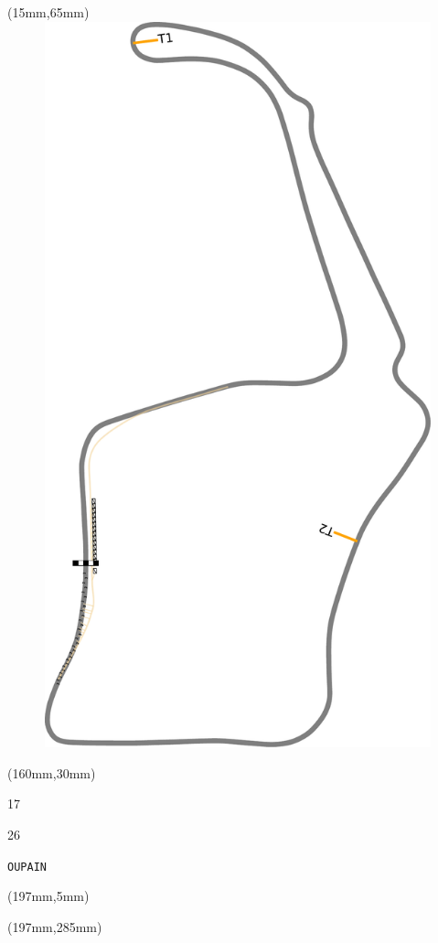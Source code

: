 \begin{textblock*}{185mm}(15mm,65mm)%
\centering
\mbox{\includegraphics[width=185mm,height=210mm,keepaspectratio]{PT/OUPAIN.pdf}}
\end{textblock*}
\begin{textblock*}{40mm}(160mm,30mm)%
\Large
\par{} 
\par17 
\par26 
\par\hfill\tiny\tt OUPAIN\\
\end{textblock*}
\begin{textblock*}{20mm}(197mm,5mm)%
\fbox{\thepage}
\label{OUPAIN}
\end{textblock*}
\begin{textblock*}{20mm}(197mm,285mm)%
\fbox{\thepage}
\end{textblock*}

